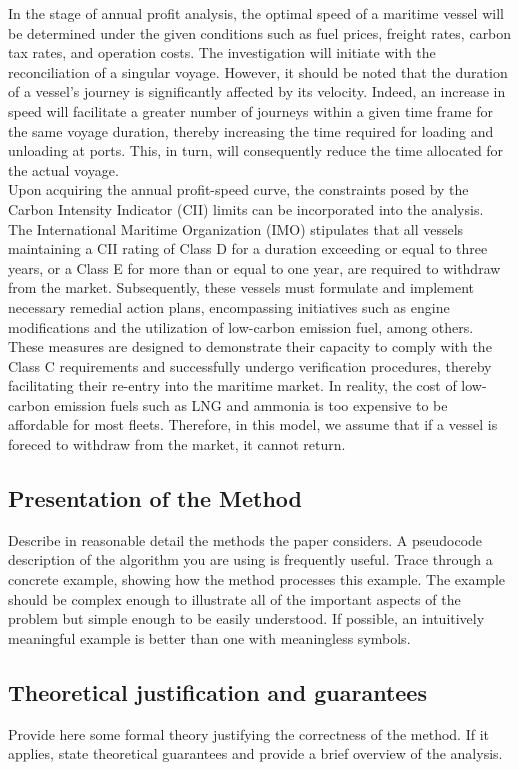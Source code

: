 \documentclass[a4paper,12pt]{article}
\begin{document}
In the stage of annual profit analysis, the optimal speed of a maritime vessel will be determined under the given conditions such as fuel prices, freight rates, carbon tax rates, and operation costs.
The investigation will initiate with the reconciliation of a singular voyage.
However, it should be noted that the duration of a vessel's journey is significantly affected by its velocity.
Indeed, an increase in speed will facilitate a greater number of journeys within a given time frame for the same voyage duration, thereby increasing the time required for loading and unloading at ports.
This, in turn, will consequently reduce the time allocated for the actual voyage.\\

Upon acquiring the annual profit-speed curve, the constraints posed by the Carbon Intensity Indicator (CII) limits can be incorporated into the analysis.
The International Maritime Organization (IMO) stipulates that all vessels maintaining a CII rating of Class D for a duration exceeding or equal to three years, or a Class E for more than or equal to one year, are required to withdraw from the market.
Subsequently, these vessels must formulate and implement necessary remedial action plans, encompassing initiatives such as engine modifications and the utilization of low-carbon emission fuel, among others.
These measures are designed to demonstrate their capacity to comply with the Class C requirements and successfully undergo verification procedures, thereby facilitating their re-entry into the maritime market.
In reality, the cost of low-carbon emission fuels such as LNG and ammonia is too expensive to be affordable for most fleets. Therefore, in this model, we assume that if a vessel is foreced to withdraw from the market, it cannot return.




\subsection{Presentation of the Method}
Describe in reasonable detail the methods the paper considers. A pseudocode description of
the algorithm you are using is frequently useful. Trace through a concrete example, showing
how the method processes this example. The example should be complex enough to
illustrate all of the important aspects of the problem but simple enough to be easily
understood. If possible, an intuitively meaningful example is better than one with
meaningless symbols.

\subsection{Theoretical justification and guarantees}
Provide here some formal theory justifying the correctness of the method. If it applies, state theoretical guarantees and provide a brief overview of the analysis.
\end{document}
